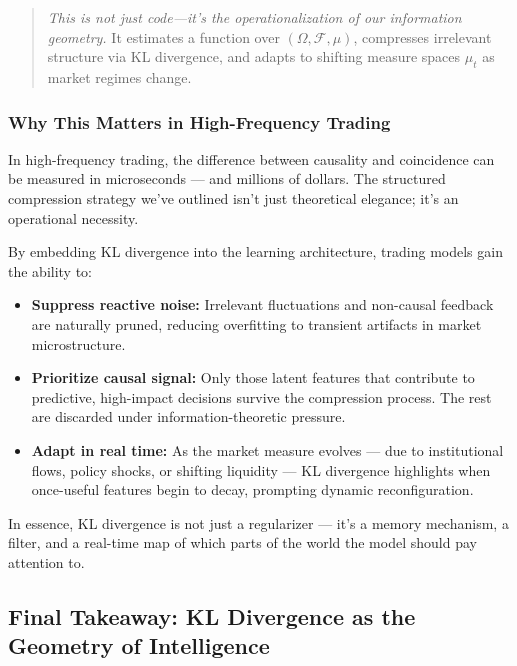 \begin{quote}
\textit{This is not just code—it’s the operationalization of our information geometry.}
It estimates a function over \( (\Omega, \mathcal{F}, \mu) \), compresses irrelevant structure via KL divergence, and adapts to shifting measure spaces \( \mu_t \) as market regimes change.
\end{quote}




\subsubsection{Why This Matters in High-Frequency Trading}

In high-frequency trading, the difference between causality and coincidence can be measured in microseconds — and millions of dollars. The structured compression strategy we've outlined isn't just theoretical elegance; it's an operational necessity.

By embedding KL divergence into the learning architecture, trading models gain the ability to:

\begin{itemize}
    \item \textbf{Suppress reactive noise:} Irrelevant fluctuations and non-causal feedback are naturally pruned, reducing overfitting to transient artifacts in market microstructure.

    \item \textbf{Prioritize causal signal:} Only those latent features that contribute to predictive, high-impact decisions survive the compression process. The rest are discarded under information-theoretic pressure.

    \item \textbf{Adapt in real time:} As the market measure evolves — due to institutional flows, policy shocks, or shifting liquidity — KL divergence highlights when once-useful features begin to decay, prompting dynamic reconfiguration.
\end{itemize}

In essence, KL divergence is not just a regularizer — it's a memory mechanism, a filter, and a real-time map of which parts of the world the model should pay attention to.

\subsection{Final Takeaway: KL Divergence as the Geometry of Intelligence}

